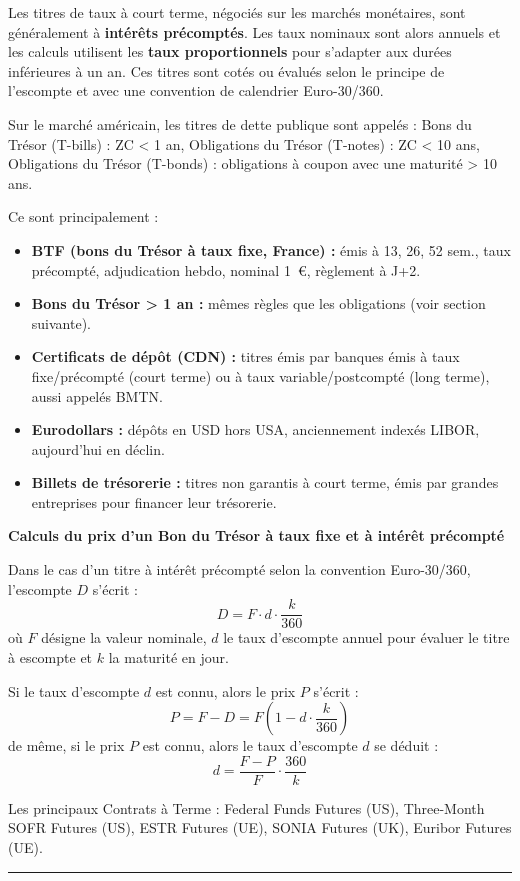 \begin{f}
Les titres de taux à court terme, négociés sur les marchés monétaires, sont généralement à \textbf{intérêts précomptés}. 
Les taux nominaux sont alors annuels et les calculs utilisent les \textbf{taux proportionnels} pour s'adapter aux durées inférieures à un an.
Ces titres sont cotés ou évalués selon le principe de l'escompte et avec  une convention de calendrier Euro-30/360.

Sur le marché américain, les titres de dette publique sont appelés :
 Bons du Trésor ({T-bills}) : ZC < 1 an,  Obligations du Trésor ({T-notes}) : ZC < 10 ans,
Obligations du Trésor ({T-bonds}) : obligations à coupon avec une maturité > 10 ans.


Ce sont principalement :
\begin{itemize}
  \item \textbf{BTF (bons du Trésor à taux fixe, France) :} émis à 13, 26, 52 sem., taux précompté, adjudication hebdo, nominal 1~€, règlement à J+2.
  
  \item \textbf{Bons du Trésor > 1 an :} mêmes règles que les obligations (voir section suivante).
  
  \item \textbf{Certificats de dépôt (CDN) :} titres émis par banques émis à taux fixe/précompté (court terme) ou à taux variable/postcompté (long terme), aussi appelés BMTN.

  \item \textbf{Eurodollars :} dépôts en USD hors USA, anciennement indexés LIBOR, aujourd’hui en déclin.

  \item \textbf{Billets de trésorerie :} titres non garantis à court terme, émis par grandes entreprises pour financer leur trésorerie.
\end{itemize}

\textbf{Calculs du prix d'un  Bon du Trésor  à taux fixe et à intérêt précompté}

Dans le cas d'un titre à intérêt précompté selon la convention Euro-30/360, l'escompte \(D\) s'écrit :
\[
D=F \cdot d \cdot \frac{k}{360}
\]
où \(F\) désigne la valeur nominale, \(d\) le taux d'escompte annuel pour évaluer le titre à escompte et \(k\) la maturité en jour.

Si le taux d'escompte \(d\) est connu, alors le prix \(P\) s'écrit :
\[
P=F-D=F\left(1-d \cdot \frac{k}{360}\right)
\]
de même, si le prix \(P\) est connu, alors le taux d'escompte \(d\) se déduit :
\[
d=\frac{F-P}{F} \cdot \frac{360}{k}
\]


Les principaux Contrats à Terme  : Federal Funds Futures (US),
Three-Month SOFR Futures (US),
ESTR Futures (UE),
SONIA Futures (UK),
Euribor Futures (UE).

\end{f}
\hrule



